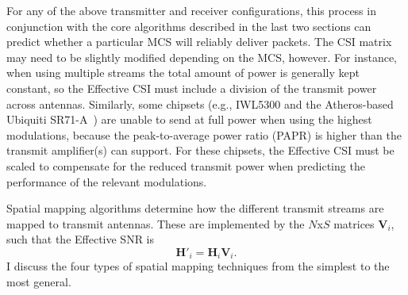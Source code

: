  For any of the above transmitter and receiver configurations, this process in conjunction with the core algorithms described in the last two sections can predict whether a particular MCS will reliably deliver packets. The CSI matrix may need to be slightly modified depending on the MCS, however. For instance, when using multiple streams the total amount of power is generally kept constant, so the Effective CSI must include a division of the transmit power across antennas. Similarly, some chipsets (e.g., IWL5300 and the Atheros-based Ubiquiti SR71-A~\cite{sr71a}) are unable to send at full power when using the highest modulations, because the peak-to-average power ratio (PAPR) is higher than the transmit amplifier(s) can support. For these chipsets, the Effective CSI must be scaled to compensate for the reduced transmit power when predicting the performance of the relevant modulations.

 Spatial mapping algorithms determine how the different transmit streams are mapped to transmit antennas. These are implemented by the $N$x$S$ matrices $\mathbf{V}_i$, such that the Effective SNR is
\begin{equation}
	\mathbf{H}'_i = \mathbf{H}_i\mathbf{V}_i.
\end{equation}
I discuss the four types of spatial mapping techniques from the simplest to the most general.

